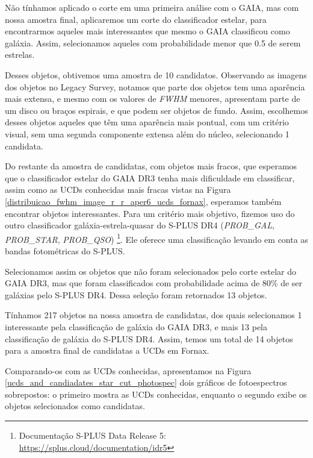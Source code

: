 Não tínhamos aplicado o corte em uma primeira análise com o GAIA, mas com nossa amostra final, aplicaremos um corte do classificador estelar, para encontrarmos aqueles mais interessantes que mesmo o GAIA classificou como galáxia. Assim, selecionamos aqueles com probabilidade menor que 0.5 de serem estrelas.

Desses objetos, obtivemos uma amostra de 10 candidatos. Observando as imagens dos objetos no Legacy Survey, notamos que parte dos objetos tem uma aparência mais extensa, e mesmo com os valores de \textit{FWHM} menores, apresentam parte de um disco ou braços espirais, e que podem ser objetos de fundo. Assim, escolhemos desses objetos aqueles que têm uma aparência mais pontual, com um critério visual, sem uma segunda componente extensa além do núcleo, selecionando 1 candidata. 


Do restante da amostra de candidatas, com objetos mais fracos, que esperamos que o classificador estelar do GAIA DR3 tenha mais dificuldade em classificar, assim como as UCDs conhecidas mais fracas vistas na Figura \ref{distribuicao_fwhm_image_r_r_aper6_ucds_fornax}, esperamos também encontrar objetos interessantes. Para um critério mais objetivo, fizemos uso do outro classificador galáxia-estrela-quasar do S-PLUS DR4 (\textit{PROB\_GAL}, \textit{PROB\_STAR}, \textit{PROB\_QSO}) \citep{lili_classification}\footnote{Documentação S-PLUS Data Release 5: \url{https://splus.cloud/documentation/idr5}}. Ele oferece uma classificação levando em conta as bandas fotométricas do S-PLUS.

Selecionamos assim os objetos que não foram selecionados pelo corte estelar do GAIA DR3, mas que foram classificados com probabilidade acima de 80\% de ser galáxias pelo S-PLUS DR4. Dessa seleção foram retornados 13 objetos.

Tínhamos 217 objetos na nossa amostra de candidatas, dos quais selecionamos 1 interessante pela classificação de galáxia do GAIA DR3, e mais 13 pela classificação de galáxia do S-PLUS DR4. Assim, temos um total de 14 objetos para a amostra final de candidatas a UCDs em Fornax.

Comparando-os com as UCDs conhecidas, apresentamos na Figura \ref{ucds_and_candiadates_star_cut_photospec} dois gráficos de fotoespectros sobrepostos: o primeiro mostra as UCDs conhecidas, enquanto o segundo exibe os objetos selecionados como candidatas.


